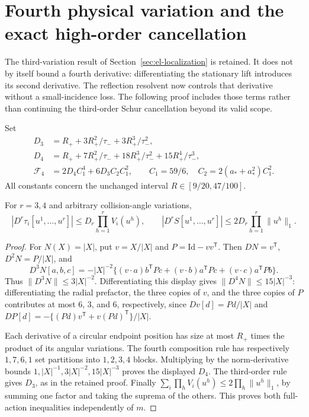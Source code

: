 \section{Fourth physical variation and the exact high-order cancellation}
\label{sec:gr-fourth}
The third-variation result of Section~\ref{sec:el-localization} is retained.
It does not by itself bound a fourth derivative: differentiating the
stationary lift introduces its second derivative. The reflection
resolvent now controls that derivative without a small-incidence loss.
The following proof includes those terms rather than continuing the
third-order Schur cancellation beyond its valid scope.

Set
\begin{align}
 D_3&=R_++3R_+^2/\tau_-+3R_+^3/\tau_-^2,\\
 D_4&=R_++7R_+^2/\tau_-+18R_+^3/\tau_-^2+15R_+^4/\tau_-^3,\\
 \mathcal F_4&=2D_4C_1^4+6D_3C_2C_1^2,
 \qquad C_1=59/6,\quad C_2=2(a_*+a_*^2)C_1^2.
 \label{eq:gr-fourth-constant}
\end{align}
All constants concern the unchanged interval $R\in[9/20,47/100]$.

\begin{lemma}\label{lem:gr-flight-four}
For $r=3,4$ and arbitrary collision-angle variations,
\[
 |D^r\tau_i[u^1,\ldots,u^r]|
       \le D_r\prod_{h=1}^r V_i(u^h),
 \qquad
 |D^rS[u^1,\ldots,u^r]|
       \le2D_r\prod_{h=1}^r\|u^h\|_1.
\]
\end{lemma}
\begin{proof}
For $N(X)=|X|$, put $v=X/|X|$ and $P=\mathrm{Id}-vv^{\mathsf T}$.
Then $DN=v^{\mathsf T}$, $D^2N=P/|X|$, and
\[
 D^3N[a,b,c]
 =-|X|^{-2}\{(v\cdot a)b^{\mathsf T}Pc
              +(v\cdot b)a^{\mathsf T}Pc
              +(v\cdot c)a^{\mathsf T}Pb\}.
\]
Thus $\|D^3N\|\le3|X|^{-2}$. Differentiating this display gives
$\|D^4N\|\le15|X|^{-3}$: differentiating the radial prefactor,
the three copies of $v$, and the three copies of $P$ contributes
at most $6$, $3$, and $6$, respectively, since
$Dv[d]=Pd/|X|$ and
$DP[d]=-\{(Pd)v^{\mathsf T}+v(Pd)^{\mathsf T}\}/|X|$.

Each derivative of a circular endpoint position has size at most
$R_+$ times the product of its angular variations. The fourth
composition rule has respectively $1,7,6,1$ set partitions into
$1,2,3,4$ blocks. Multiplying by the norm-derivative bounds
$1,|X|^{-1},3|X|^{-2},15|X|^{-3}$ proves the displayed $D_4$.
The third-order rule gives $D_3$, as in the retained proof.
Finally $\sum_i\prod_h V_i(u^h)\le2\prod_h\|u^h\|_1$,
by summing one factor and taking the suprema of the others.
This proves both full-action inequalities independently of $m$.
\end{proof}

